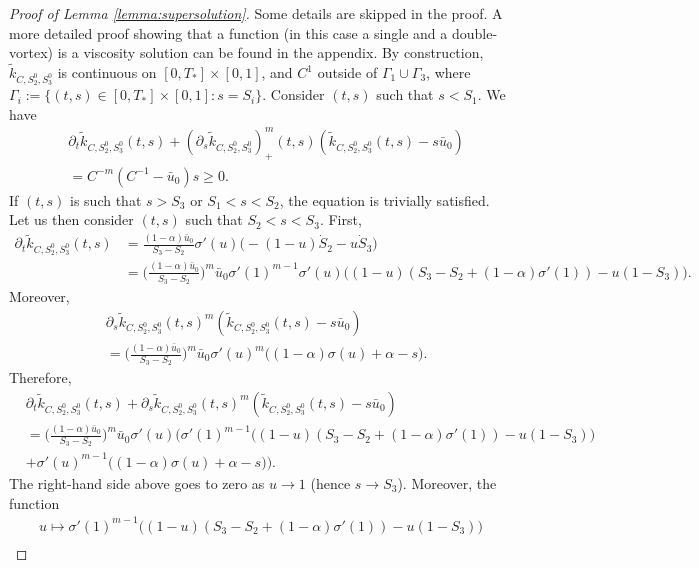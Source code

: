 \documentclass[10pt,a4paper]{amsart}
\newcommand{\al}{\alpha}
\newcommand{\p}{{\partial}}
\begin{document}
\begin{proof}[Proof of Lemma \ref{lemma:supersolution}]
Some details are skipped in the proof. A more detailed proof showing that a function (in this case a single and a double-vortex) is a viscosity solution can be found in the appendix.
By construction, $ \tilde k_{C,S_2^0,S_3^0}$ is continuous on $[0,T_*]\times [0,1]$, and $C^1$ outside of $\Gamma_1 \cup \Gamma_3$, where $\Gamma_i := \{(t,s) \in [0,T_*]\times [0,1] : s= S_i \}$. Consider $(t,s)$ such that $s< S_1$. We have
\begin{align*}
    &\p_t \tilde k_{C,S_2^0,S_3^0} (t,s) + (\p_s \tilde k_{C,S_2^0,S_3^0})^m_+(t,s) (\tilde k_{C,S_2^0,S_3^0}(t,s)-s\bar u_0) \\
    &= C^{-m}(C^{-1}-\bar u_0) s \ge 0.
\end{align*}
If $(t,s)$ is such that $s>S_3$ or $S_1<s<S_2$, the equation is trivially satisfied. Let us then consider $(t,s)$ such that $S_2 < s < S_3$. First,
\begin{align*}
    \p_t \tilde k_{C,S_2^0,S_3^0}(t,s) &= \frac{(1-\al)\bar u_0}{S_3-S_2} \sigma'(u) \big( -(1-u)\dot S_2 - u \dot S_3  \big) \\
    &= \bigg(\frac{(1-\al)\bar u_0}{S_3-S_2}\bigg)^m \bar u_0 \sigma'(1)^{m-1} \sigma'(u)  \big( (1-u) (S_3-S_2 + (1-\al)\sigma'(1)) - u(1-S_3)\big).
\end{align*}
Moreover,
\begin{align*}
    &\p_s \tilde k_{C,S_2^0,S_3^0}(t,s)^m(\tilde k_{C,S_2^0,S_3^0}(t,s) -s \bar u_0) \\
    &= \bigg(\frac{(1-\al)\bar u_0}{S_3-S_2}\bigg)^m \bar u_0 \sigma'(u)^m \big( (1-\al) \sigma(u) + \al - s \big) .
\end{align*}
Therefore, 
\begin{align*}
    &\p_t \tilde k_{C,S_2^0,S_3^0}(t,s) +\p_s \tilde k_{C,S_2^0,S_3^0}(t,s)^m(\tilde k_{C,S_2^0,S_3^0}(t,s) -s \bar u_0) \\
    &= \bigg(\frac{(1-\al)\bar u_0}{S_3-S_2}\bigg)^m \bar u_0\sigma'(u)\bigg( \sigma'(1)^{m-1}   \big( (1-u) (S_3-S_2 + (1-\al)\sigma'(1)) - u(1-S_3)\big) \\
    &+ \sigma'(u)^{m-1} \big( (1-\al) \sigma(u) + \al - s \big)  \bigg).
\end{align*}
The right-hand side above goes to zero as $u\to 1$ (hence $s\to S_3$). Moreover, the function 
\begin{multline*}
    u\mapsto \sigma'(1)^{m-1}   \big( (1-u) (S_3-S_2 + (1-\al)\sigma'(1)) - u(1-S_3)\big) \\

\end{multline*}
\end{proof}
\end{document}

